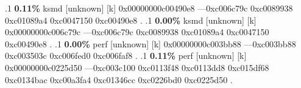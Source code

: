 \begin{profile}
{.1 \textbf{ 0.11\%} ksmd             [unknown]              [k] 0x00000000c00490e8\newline {} ---0xc006c79c\newline {} 0xc0089938\newline {} 0xc01089a4\newline {} 0xc0047150\newline {} 0xc00490e8\newline {} . 
.1 \textbf{ 0.00\%} ksmd             [unknown]              [k] 0x00000000c006c79c\newline {} ---0xc006c79c\newline {} 0xc0089938\newline {} 0xc01089a4\newline {} 0xc0047150\newline {} 0xc00490e8\newline {} . 
.1 \textbf{ 0.00\%} perf             [unknown]              [k] 0x00000000c003bb88\newline {} ---0xc003bb88\newline {} 0xc003503c\newline {} 0xc006fed0\newline {} 0xc006faf8\newline {} . 
.1 \textbf{ 0.11\%} perf             [unknown]              [k] 0x00000000c0225d50\newline {} ---0xc003c100\newline {} 0xc0113f48\newline {} 0xc0113dd8\newline {} 0xc015df68\newline {} 0xc0134bac\newline {} 0xc00a3fa4\newline {} 0xc01346cc\newline {} 0xc0226bd0\newline {} 0xc0225d50\newline {} . 
}
\end{profile}
